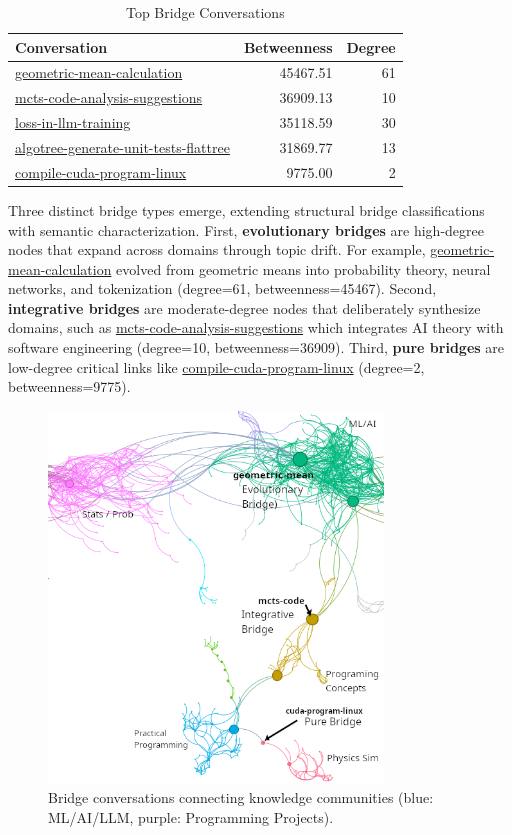 \documentclass{svproc}
\begin{document}
\begin{table}
\centering
\caption{Top Bridge Conversations}
\label{tab:bridges}
\begin{tabular}{lrr}
\toprule
\textbf{Conversation} & \textbf{Betweenness} & \textbf{Degree} \\
\midrule
\url{geometric-mean-calculation} & 45467.51 & 61 \\
\url{mcts-code-analysis-suggestions} & 36909.13 & 10 \\
\url{loss-in-llm-training} & 35118.59 & 30 \\
\url{algotree-generate-unit-tests-flattree} & 31869.77 & 13 \\
\url{compile-cuda-program-linux} & 9775.00 & 2 \\
\bottomrule
\end{tabular}
\end{table}

Three distinct bridge types emerge, extending structural bridge classifications \cite{granovetter1973,burt1992} with semantic characterization. First, \textbf{evolutionary bridges} are high-degree nodes that expand across domains through topic drift. For example, \url{geometric-mean-calculation} evolved from geometric means into probability theory, neural networks, and tokenization (degree=61, betweenness=45467). Second, \textbf{integrative bridges} are moderate-degree nodes that deliberately synthesize domains, such as \url{mcts-code-analysis-suggestions} which integrates AI theory with software engineering (degree=10, betweenness=36909). Third, \textbf{pure bridges} are low-degree critical links like \url{compile-cuda-program-linux} (degree=2, betweenness=9775).

\begin{figure}[!h] %
\centering
\includegraphics[width=3.5in]{./images/bridge-better.png}
\caption{Bridge conversations connecting knowledge communities (blue: ML/AI/LLM, purple: Programming Projects).}
\label{fig:bridge_zoom}
\end{figure}
\end{document}
